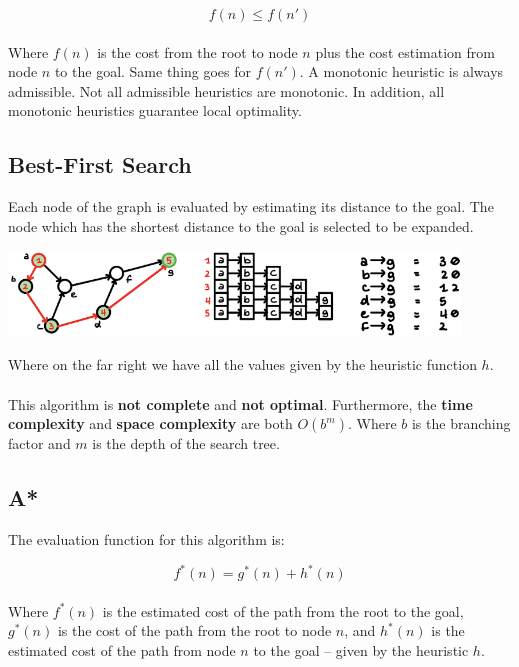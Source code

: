 \documentclass{article}
\begin{document}
\[ f(n) \leq f(n') \] \\
Where $f(n)$ is the cost from the root to node $n$ plus the cost estimation from node $n$ to the goal. Same thing goes for $f(n')$. A monotonic heuristic is always admissible. Not all admissible heuristics are monotonic. In addition, all monotonic heuristics guarantee local optimality.

\subsection{Best-First Search}
Each node of the graph is evaluated by estimating its distance to the goal. The node which has the shortest distance to the goal is selected to be expanded.\\

\begin{center}
	\includegraphics[width=12cm]{befs.png}
\end{center}
\vspace{.3cm}
Where on the far right we have all the values given by the heuristic function $h$. \\ \\
This algorithm is \textbf{not complete} and \textbf{not optimal}. Furthermore, the \textbf{time complexity} and \textbf{space complexity} are both $O(b^m)$. Where $b$ is the branching factor and $m$ is the depth of the search tree.

\subsection{A*}
The evaluation function for this algorithm is:

\[ f^*(n) = g^*(n) + h^*(n) \] \\
Where $f^*(n)$ is the estimated cost of the path from the root to the goal, $g^*(n)$ is the cost of the path from the root to node $n$, and $h^*(n)$ is the estimated cost of the path from node $n$ to the goal -- given by the heuristic $h$.\\
\end{document}
